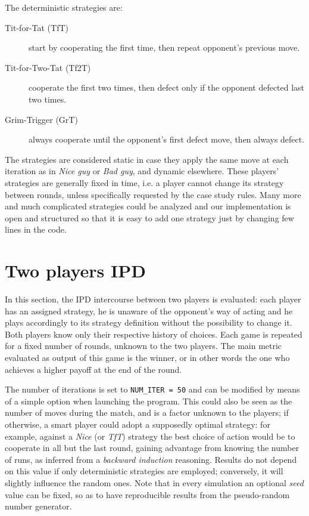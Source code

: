 \documentclass[journal,10pt,twoside]{IEEEtran}
\begin{document}
The deterministic strategies are:
\begin{description}
    \item[Tit-for-Tat (TfT)] start by cooperating the first time, then repeat opponent's previous move.
    \item[Tit-for-Two-Tat (Tf2T)] cooperate the first two times, then defect only if the opponent defected last two times.
    \item[Grim-Trigger (GrT)] always cooperate until the opponent's first defect move, then always defect. 
\end{description}

The strategies are considered static in case they apply the same move at each iteration as in \textit{Nice guy} or \textit{Bad guy}, and dynamic elsewhere.
These players' strategies are generally fixed in time, i.e. a player cannot change its strategy between rounds, unless specifically requested by the case study rules.
Many more and much complicated strategies could be analyzed and our implementation is open and structured so that it is easy to add one strategy just by changing few lines in the code.

\section{Two players IPD} \label{s:IPD2P}
In this section, the IPD intercourse between two players is evaluated: each player has an assigned strategy, he is unaware of the opponent's way of acting and he plays accordingly to its strategy definition without the possibility to change it. Both players know only their respective history of choices. Each game is repeated for a fixed number of rounds, unknown to the two players. The main metric evaluated as output of this game is the winner, or in other words the one who achieves a higher payoff at the end of the round.

The number of iterations is set to \texttt{NUM\_ITER = 50} and can be modified by means of a simple option when launching the program.
This could also be seen as the number of moves during the match, and is a factor unknown to the players; if otherwise, a smart player could adopt a supposedly optimal strategy: for example, against a \textit{Nice} (or \textit{TfT}) strategy the best choice of action would be to cooperate in all but the last round, gaining advantage from knowing the number of runs, as inferred from a \textit{backward induction} reasoning.
Results do not depend on this value if only deterministic strategies are employed; conversely, it will slightly influence the random ones.
Note that in every simulation an optional \textit{seed} value can be fixed, so as to have reproducible results from the pseudo-random number generator.
\end{document}
